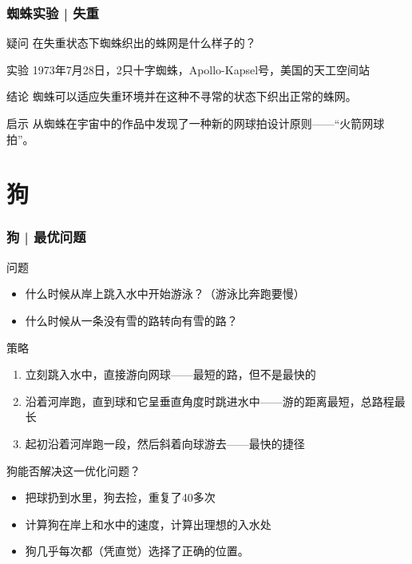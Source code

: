 \begin{frame}
  \frametitle{蜘蛛实验 | 失重}
  \begin{block}{疑问}
    在失重状态下蜘蛛织出的蛛网是什么样子的？
  \end{block}
  \pause
  \begin{block}{实验}
    1973年7月28日，2只十字蜘蛛，Apollo-Kapsel号，美国的天工空间站
  \end{block}
  \pause
  \begin{block}{结论}
    蜘蛛可以适应失重环境并在这种不寻常的状态下织出正常的蛛网。
  \end{block}
  \pause
  \begin{block}{启示}
   从蜘蛛在宇宙中的作品中发现了一种新的网球拍设计原则——“火箭网球拍”。
  \end{block}
\end{frame}

\section{狗}
\begin{frame}
  \frametitle{狗 | 最优问题}
  \begin{block}{问题}
    \begin{itemize}
      \item 什么时候从岸上跳入水中开始游泳？（游泳比奔跑要慢）
      \item 什么时候从一条没有雪的路转向有雪的路？
    \end{itemize}
  \end{block}
  \vspace{-0.3em}
  \pause
  \begin{block}{策略}
    \begin{enumerate}
      \item 立刻跳入水中，直接游向网球——最短的路，但不是最快的
      \item 沿着河岸跑，直到球和它呈垂直角度时跳进水中——游的距离最短，总路程最长
      \item 起初沿着河岸跑一段，然后斜着向球游去——最快的捷径
    \end{enumerate}
  \end{block}
  \vspace{-0.3em}
  \pause
  \begin{block}{狗能否解决这一优化问题？}
    \begin{itemize}
      \item 把球扔到水里，狗去捡，重复了40多次
      \item 计算狗在岸上和水中的速度，计算出理想的入水处
      \item 狗几乎每次都（凭直觉）选择了正确的位置。
    \end{itemize}
  \end{block}
\end{frame}


